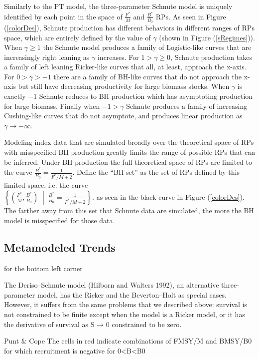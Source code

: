 %
Similarly to the PT model, the three-parameter Schnute model is uniquely
identified by each point in the space of $\frac{F^*}{M}$
and $\frac{B^*}{B_0}$ RPs. As seen in Figure (\ref{colorDes}), Schnute
production has different behaviors in different ranges of RPs space, which
are entirely defined by the value of $\gamma$ (shown in Figure (\ref{sRegimes})).
When $\gamma\ge1$ the Schnute model produces a family of Logistic-like curves that are
increasingly right leaning as $\gamma$ increases.
For $1>\gamma\ge0$, Schnute production takes a family of left leaning Ricker-like curves
that all, at least, approach the x-axis. For $0>\gamma>-1$ there are a family of BH-like
curves that do not approach the x-axis but still have decreasing productivity for large
biomass stocks. When $\gamma$ is exactly $-1$ Schnute reduces to BH production which has
asymptoting production for large biomass. Finally when $-1>\gamma$ Schnute
produces a family of increasing Cushing-like curves that do not asymptote, and produces
linear production as $\gamma\to-\infty$.

%
Modeling index data that are simulated broadly over the theoretical space of RPs
with misspecified BH production greatly limits the range of possible RPs that
can be inferred. Under BH production the full theoretical space of RPs are
limited to the curve \mbox{$\frac{B^*}{B_0}=\frac{1}{F^*/M+2}$.} Define the
``BH set'' as the set of RPs defined by this limited space, i.e. the curve \\
$\left\{\left(\frac{F^*}{M}, \frac{B^*}{B_0}\right) \;\middle|\; \frac{B^*}{B_0}=\frac{1}{F^*/M+2}\right\}$.
as seen in the {\color{red}black curve} in Figure (\ref{colorDes}).
The farther away from this set that Schnute data are simulated, the more the
BH model is misspecified for those data.

%
\subsection{Metamodeled Trends}

{\color{red} \cite{punt_extending_2019} \cite{myers_maximum_1999} for the bottom left corner

The Deriso–Schnute model (Hilborn and Walters 1992),
an alternative three-parameter model, has the Ricker and the
Beverton–Holt as special cases. However, it suffers from the
same problems that we described above: survival is not constrained to be finite 
except when the model is a Ricker model, or it has the derivative of survival 
as S → 0 constrained to be zero.

Punt \& Cope
The cells in red indicate combinations of FMSY/M and BMSY/B0 for which 
recruitment is negative for 0<B<B0
}

